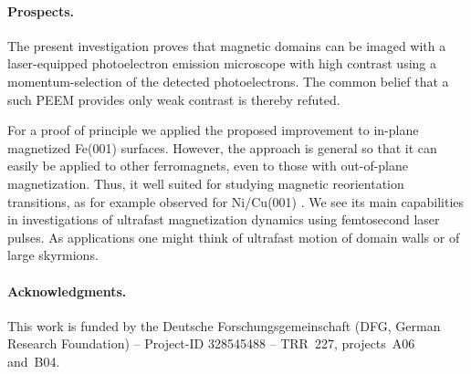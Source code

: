 \documentclass[prl,twocolumn,floatfix]{revtex4-2}
\begin{document}
\paragraph{Prospects.} The present investigation proves that magnetic domains can be imaged with a laser-equipped photoelectron emission microscope with high contrast using a momentum-selection of the detected photoelectrons. The common belief that a such PEEM provides only weak contrast is thereby refuted.

For a proof of principle we applied the proposed improvement to in-plane magnetized Fe(001) surfaces. However, the approach is general so that it can easily be applied to other ferromagnets, even to those with out-of-plane magnetization. Thus, it well suited for studying magnetic reorientation transitions, as for example observed for Ni/Cu(001) . We see its main capabilities in investigations of ultrafast magnetization dynamics using femtosecond laser pulses. As applications one might think of ultrafast motion of domain walls  or of large skyrmions.

\paragraph{Acknowledgments.} This work is funded by the Deutsche Forschungsgemeinschaft (DFG, German Research Foundation) -- Project-ID 328545488 -- TRR~227, projects~A06 and~B04.

% 


\listoftodos
\end{document}
